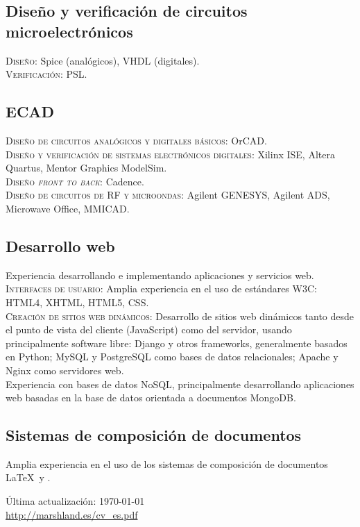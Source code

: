 \documentclass[11pt, a4paper]{article}
\begin{document}
\subsection*{Diseño y verificación de circuitos microelectrónicos}
\noindent
	\textsc{Diseño}: Spice (analógicos), VHDL (digitales).\\
	\textsc{Verificación}: PSL.
\subsection*{ECAD}
\noindent
	\textsc{Diseño de circuitos analógicos y digitales básicos}: OrCAD.\\
	\textsc{Diseño y verificación de sistemas electrónicos digitales}: Xilinx ISE, Altera Quartus, Mentor Graphics ModelSim.\\
	\textsc{Diseño \emph{front to back}}: Cadence.\\
	\textsc{Diseño de circuitos de RF y microondas}: Agilent GENESYS, Agilent ADS, Microwave Office, MMICAD.
\subsection*{Desarrollo web}
\noindent
	Experiencia desarrollando e implementando aplicaciones y servicios web.\\
	\textsc{Interfaces de usuario}: Amplia experiencia en el uso de estándares W3C: HTML4, XHTML, HTML5, CSS.\\
	\textsc{Creación de sitios web dinámicos}: Desarrollo de sitios web dinámicos tanto desde el punto de vista del cliente (JavaScript) como del servidor, usando principalmente software libre: Django y otros frameworks, generalmente basados en Python; MySQL y PostgreSQL como bases de datos relacionales; Apache y Nginx como servidores web.\\
	Experiencia con bases de datos NoSQL, principalmente desarrollando aplicaciones web basadas en la base de datos orientada a documentos MongoDB.
\subsection*{Sistemas de composición de documentos}
\noindent
	Amplia experiencia en el uso de los sistemas de composición de documentos \LaTeX\ y \XeTeX.


\vfill{}
\hrulefill


\begin{center}
{\scriptsize
	Última actualización: \today \\
	\href{http://marshland.es/cv_es.pdf}
	     {http://marshland.es/cv\_es.pdf}
}
\end{center}
\end{document}
